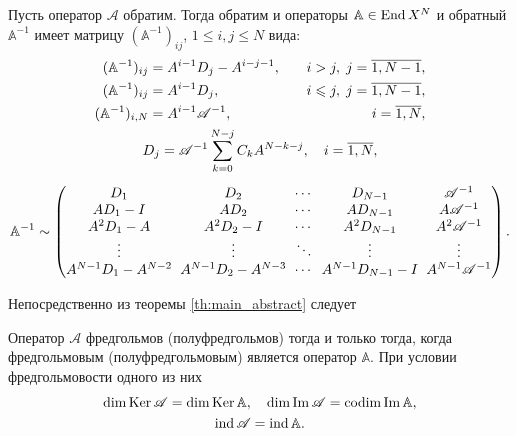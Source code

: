 \begin{theorem}\label{th:inverse}
    Пусть оператор $\mathcal A$ обратим. Тогда обратим и операторы $\mathbb A \in \operatorname{End} X^N$ и обратный $\mathbb A^{-1}$ имеет матрицу $(\mathbb A^{-1})_{ij}$, $1 \leq i, j \leq N$ вида:
    \begin{gather*}
        \begin{aligned}
        (\mathbb A^{-1})_{ij} &= A^{i-1} D_j - A^{i-j-1}, &\quad i > j, \; j = \overline{1,N-1}, \\
        (\mathbb A^{-1})_{ij} &= A^{i-1} D_j, &\quad i \leq j, \; j = \overline{1,N-1}, \\
        (\mathbb A^{-1})_{i,N} &= A^{i-1} \mathcal A^{-1}, &\quad i = \overline{1,N},
        \end{aligned}\\
        D_j = \mathcal A^{-1} \sum_{k = 0}^{N-j} C_k A^{N-k-j}, \quad i = \overline{1,N},\\[0.5em]
        \mathbb A^{-1} \sim
        \begingroup
        \renewcommand*{\arraycolsep}{3pt}
        \begin{pmatrix}
          D_1 &  D_2 &  \cdots & D_{N-1} &  \mathcal A^{-1} \\
          A D_1 - I & A D_2 & \cdots & A D_{N-1} & A  \mathcal A^{-1} \\
          A^2 D_1 - A & A^2 D_2 - I & \cdots & A^2 D_{N-1} & A^2 \mathcal A^{-1} \\
          \vdots & \vdots & \ddots & \vdots & \vdots \\
          A^{N-1} D_1 - A^{N-2} & A^{N-1} D_2 - A^{N-3} & \cdots & A^{N-1} D_{N-1} - I & A^{N-1}  \mathcal A^{-1}
       \end{pmatrix}
       \endgroup.
    \end{gather*}
\end{theorem}

Непосредственно из теоремы \ref{th:main_abstract} следует
\begin{theorem}\label{th:abstract_fredholm}
    Оператор $\mathcal A$ фредгольмов (полуфредгольмов) тогда и только тогда, когда фредгольмовым (полуфредгольмовым) является оператор $\mathbb A$. При условии фредгольмовости одного из них
    \begin{gather*}
    \dim \operatorname{Ker} \mathcal A = \dim \operatorname{Ker} \mathbb A, \quad \dim \operatorname{Im} \mathcal A = \operatorname{codim} \operatorname{Im} \mathbb A, \\
    \operatorname{ind} \mathcal A = \operatorname{ind} \mathbb A.
    \end{gather*}
\end{theorem}

